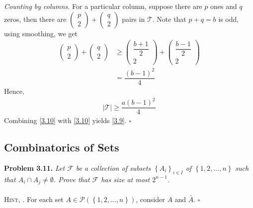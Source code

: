 \documentclass[a4paper,oneside]{article}
\numberwithin{equation}{section}
\begin{document}
\textit{Counting by columns.} For a particular column, suppose there are $p$ ones and $q$ zeros, then there are $\left( {\begin{array}{*{20}{c}}
p\\
2
\end{array}} \right) + \left( {\begin{array}{*{20}{c}}
q\\
2
\end{array}} \right)$ pairs in $\mathcal{T}$. Note that $p+q=b$ is odd, using smoothing, we get
\begin{align}
\left( {\begin{array}{*{20}{c}}
p\\
2
\end{array}} \right) + \left( {\begin{array}{*{20}{c}}
q\\
2
\end{array}} \right) &\ge \left( {\begin{array}{*{20}{c}}
{\dfrac{{b + 1}}{2}}\\
2
\end{array}} \right) + \left( {\begin{array}{*{20}{c}}
{\dfrac{{b - 1}}{2}}\\
2
\end{array}} \right)\\
& = \dfrac{{{{\left( {b - 1} \right)}^2}}}{4}
\end{align}
Hence,
\begin{align}
\label{3.13}
\left| \mathcal{T} \right| \ge \dfrac{{a{{\left( {b - 1} \right)}^2}}}{4}
\end{align}
Combining \eqref{3.10} with \eqref{3.10} yields \eqref{3.9}. \hfill $\square$
\subsection{Combinatorics of Sets}
\textbf{Problem 3.11.} \textit{Let $\mathcal{F}$ be a collection of subsets ${\left\{ {{A_i}} \right\}_{i \in I}}$ of $\left\{ {1,2, \ldots ,n} \right\}$ such that ${A_i} \cap {A_j} \ne \emptyset $. Prove that $\mathcal{F}$ has size at most $2^{n-1}$.}\\
\\
\textsc{Hint, \cite{6}.} For each set $A \in\mathcal{P}\left( {\left\{ {1,2, \ldots ,n} \right\}} \right)$, consider $A$ and $\bar{A}$. \hfill $\square$
\end{document}
